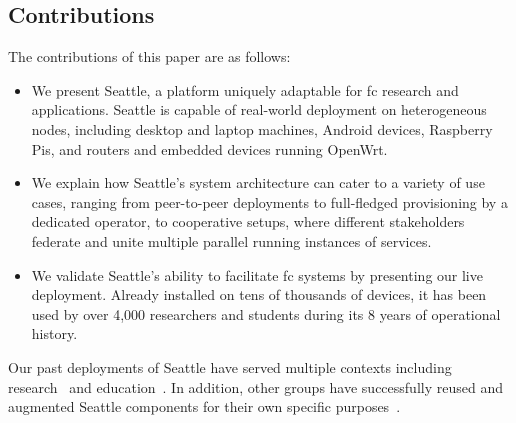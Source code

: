 \subsection{Contributions}

The contributions of this paper are as follows:
\begin{itemize}
\item We present Seattle, a platform uniquely adaptable for
 \gls{fc} research and applications. Seattle is
capable of real-world deployment on heterogeneous nodes,
including desktop and laptop machines, Android devices,
Raspberry Pis,
and routers and embedded devices running OpenWrt.
\item We explain how
Seattle's system architecture can cater to a variety of use cases,
ranging from peer-to-peer deployments to full-fledged
provisioning by a dedicated operator, to cooperative setups,
where different stakeholders federate and unite multiple parallel running
instances of services.
\item We validate Seattle's ability to facilitate \gls{fc} systems by
presenting our live deployment. Already installed on tens of thousands of
devices, it has been used by over 4,000 researchers and students during its
8 years of operational history.
\end{itemize}
Our past deployments of Seattle have served multiple contexts
including research~\cite{li2015fence,rafetseder2013sensorium,zhuang2014sensibility,Eisl1010:Service,Tuts1010:Sustained,collares2011smart,zhuang2015privacy,cappos2014blursense,7133607} and education~\cite{Wallace_CCSC_2011,Cappos_CCSCCP_2010,Cappos_CCSCNW_2009,Cappos_SIGCSE_2014,Hooshangi_SIGCSE_2015}.
In addition, other groups have successfully reused and augmented Seattle components
for their own specific purposes~\cite{chard2010social,chard12ssc,caton2014social,muller2014tomato,tomato,eittenberger2012doubtless,zhuang2012distributed,zhuang2014taking,tredger2013building}.

